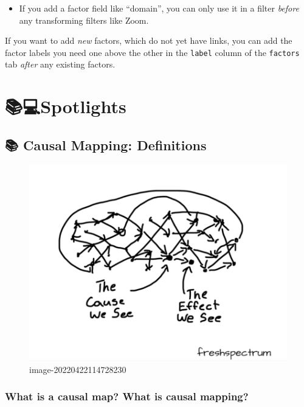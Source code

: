 \documentclass[
]{book}
\providecommand{\tightlist}{%
  \setlength{\itemsep}{0pt}\setlength{\parskip}{0pt}}
\begin{document}
\begin{itemize}
\tightlist
\item
  If you add a factor field like ``domain'', you can only use it in a filter \emph{before} any transforming filters like Zoom.
\end{itemize}

If you want to add \emph{new} factors, which do not yet have links, you can add the factor labels you need one above the other in the \texttt{label} column of the \texttt{factors} tab \emph{after} any existing factors.

\hypertarget{part-spotlights}{%
\part{📚💻Spotlights}\label{part-spotlights}}

\hypertarget{causal-mapping-definitions}{%
\chapter{📚 Causal Mapping: Definitions}\label{causal-mapping-definitions}}

\begin{figure}
\centering
\includegraphics[width=6.77083in,height=\textheight]{_assets/image-20220422114728230.png}
\caption{image-20220422114728230}
\end{figure}

\hypertarget{what-is-a-causal-map-what-is-causal-mapping}{%
\section{What is a causal map? What is causal mapping?}\label{what-is-a-causal-map-what-is-causal-mapping}}
\end{document}

